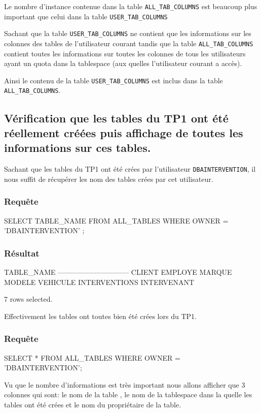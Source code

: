 \documentclass[•]{article}
\begin{document}
Le nombre d'instance contenue dans la table \texttt{ALL\_TAB\_COLUMNS} est beaucoup plus important que celui dans la table \texttt{USER\_TAB\_COLUMNS}

Sachant que la table \texttt{USER\_TAB\_COLUMNS} ne contient que les informations sur les colonnes des tables de l'utilisateur courant tandis que la table \texttt{ALL\_TAB\_COLUMNS} contient toutes les informations sur toutes les colonnes de tous les utilisateurs ayant un quota dans la tablespace (aux quelles l'utilisateur courant a accès).

Ainsi le contenu de la table \texttt{USER\_TAB\_COLUMNS} est inclus dans la table \texttt{ALL\_TAB\_COLUMNS}.

\subsection{Vérification que les tables du TP1 ont été réellement créées puis affichage de toutes les informations sur ces tables.}
Sachant que les tables du TP1 ont été crées par l'utilisateur \texttt{DBAINTERVENTION}, il nous suffit de récupérer les nom des tables crées par cet utilisateur.
\subsubsection{Requête}
\begin{sql}
SELECT TABLE_NAME 
FROM ALL_TABLES 
WHERE OWNER = 'DBAINTERVENTION' ;
\end{sql}
\subsubsection{Résultat}
\begin{sql}
TABLE_NAME
------------------------------
CLIENT
EMPLOYE
MARQUE
MODELE
VEHICULE
INTERVENTIONS
INTERVENANT

7 rows selected.
\end{sql}

Effectivement les tables ont toutes bien été crées lors du TP1.

\subsubsection{Requête}
\begin{sql}
SELECT * 
FROM ALL_TABLES 
WHERE OWNER = 'DBAINTERVENTION';
\end{sql}

Vu que le nombre d'informations est très important nous allons afficher que 3 colonnes qui sont: le nom de la table , le nom de la tablespace dans la quelle les tables ont été crées et le nom du propriétaire de la table.
\end{document}
